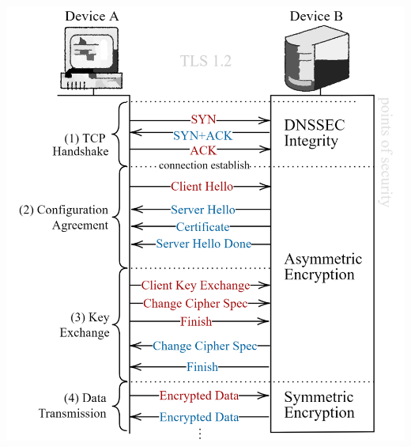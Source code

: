 \vspace{4em}
\hspace{-2em}
\includegraphics[width=.9\textwidth]{Sections/sec/enc/rsa/tls/tls12.png}

\newpage 

